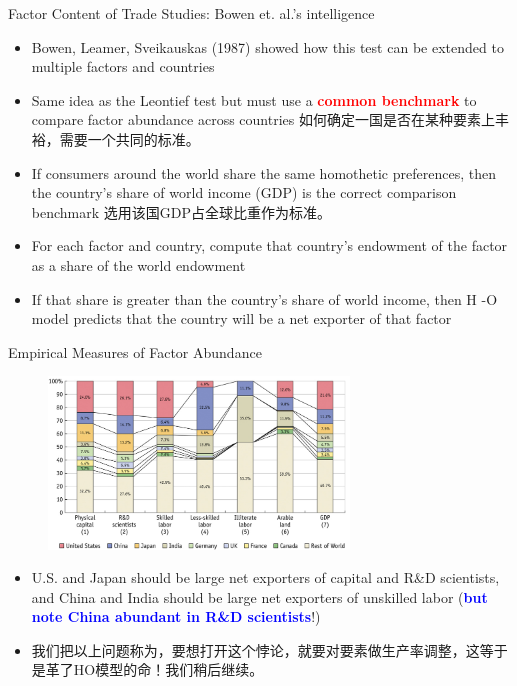 \documentclass[10pt,hyperref={CJKbookmarks=true},xcolor=dvipsnames,aspectratio=169]{beamer}
\begin{document}
\begin{frame}{Factor Content of Trade Studies: Bowen et. al.'s intelligence}

\begin{itemize}
\item Bowen, Leamer, Sveikauskas (1987) showed how this test can be extended
to multiple factors and countries 
\item Same idea as the Leontief test but must use a \textbf{\textcolor{red}{common
benchmark}} to compare factor abundance across countries 如何确定一国是否在某种要素上丰裕，需要一个共同的标准。
\item If consumers around the world share the same homothetic preferences,
then the country’s share of world income (GDP) is the correct comparison
benchmark 选用该国GDP占全球比重作为标准。
\item For each factor and country, compute that country’s endowment of the
factor as a share of the world endowment 
\item If that share is greater than the country’s share of world income,
then H -O model predicts that the country will be a net exporter of
that factor 
\end{itemize}
\end{frame}

\begin{frame}{Empirical Measures of Factor Abundance }


\begin{figure}
\begin{centering}
\includegraphics[width=8cm]{fig/ho/lec5-16}
\par\end{centering}

\end{figure}

\begin{itemize}
\item U.S. and Japan should be large net exporters of capital and R\&D scientists,
and China and India should be large net exporters of unskilled labor
(\textbf{\textcolor{blue}{but note China abundant in R\&D scientists}}!) 
\item 我们把以上问题称为，要想打开这个悖论，就要对要素做生产率调整，这等于是革了HO模型的命！我们稍后继续。
\end{itemize}
\end{frame}
\end{document}
